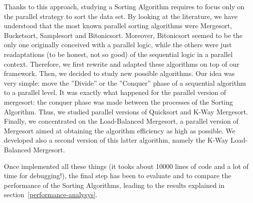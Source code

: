 Thanks to this approach, studying a Sorting Algorithm requires to focus only on the parallel strategy to sort the data set. By looking at the literature, we have understood that the most known parallel sorting algorithms were Mergesort, Bucketsort, Samplesort and Bitonicsort. Moreover, Bitonicsort seemed to be the only one originally conceived with a parallel logic, while the others were just readaptations (to be honest, not so good) of the sequential logic in a parallel context. Therefore, we first rewrite and adapted these algorithms on top of our framework. Then, we decided to study new possible algorithms. Our idea was very simple: move the ''Divide'' or the ''Conquer'' phase of a sequential algorithm to a parallel level. It was exactly what happened for the parallel version of mergesort: the conquer phase was made between the processes of the Sorting Algorithm. Thus, we studied parallel versions of Quicksort and K-Way Mergesort. Finally, we concentrated on the Load-Balanced Mergesort, a parallel version of Mergesort aimed at obtaining the algorithm efficiency as high as possible. We developed also a second version of this latter algorithm, namely the K-Way Load-Balanced Mergesort. 

Once implemented all these things (it tooks about 10000 lines of code and a lot of time for debugging!), the final step has been to evaluate and to compare the performance of the Sorting Algorithms, leading to the results explained in section~\ref{performance-analysys}. 

